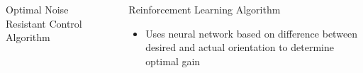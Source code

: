 \documentclass[final]{beamer}
\newlength{\sepwid}
\newlength{\onecolwid}
\begin{document}
\begin{frame}[t]
\begin{columns}[t]
\begin{column}{\onecolwid}
\begin{block}{Optimal Noise Resistant Control Algorithm}
\end{block}



\end{column} %

\begin{column}{\sepwid}\end{column} %

\begin{column}{\onecolwid} %

\begin{block}{Reinforcement Learning Algorithm}
\vskip -1cm
\begin{itemize}
    \item Uses neural network based on difference between desired and actual orientation to determine optimal gain
\end{itemize} 


\end{block}
\end{column}
\end{columns}
\end{frame}
\end{document}
